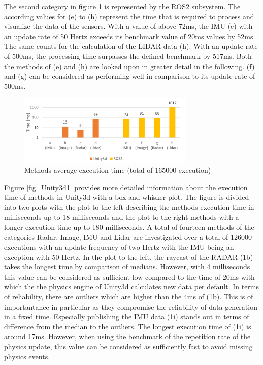 	The second category in figure \ref{fig_time} is represented by the \ac{ROS2} subsystem. The according values for (e) to (h) represent the time that is required to process and visualize the data of the sensors. With a value of above 72ms, the \ac{IMU} (e) with an update rate of 50 Hertz exceeds its benchmark value of 20ms values by 52ms. The same counts for the calculation of the \ac{LIDAR} data (h). With an update rate of 500ms, the processing time surpasses the defined benchmark by 517ms. Both the methods of (e) and (h) are looked upon in greater detail in the following. (f) and (g) can be considered as performing well in comparison to its update rate of 500ms. 
	\begin{figure}
		\begin{centering}
			\includegraphics[width=0.75\textwidth]{Bilder/Time.PNG}
			\caption{Methods average execution time (total of 165000 execution)}
			\label{fig_time}%
		\end{centering}
	\end{figure}
	
	Figure \ref{fig_Unity3d1} provides more detailed information about the execution time of methods in Unity3d with a box and whisker plot. The figure is divided into two plots with the plot to the left describing the methods execution time in milliseconds up to 18 milliseconds and the plot to the right methods with a longer execution time up to 180 milliseconds. A total of fourteen methods of the categories Radar, Image, \ac{IMU} and Lidar are investigated over a total of 126000 executions with an update frequency of two Hertz with the \ac{IMU} being an exception with 50 Hertz. In the plot to the left, the raycast of the \ac{RADAR} (1b) takes the longest time by comparison of medians. However, with 4 milliseconds this value can be considered as sufficient low compared to the time of 20ms with which the the physics engine of Unity3d calculates new data per default. In terms of reliability, there are outliers which are higher than the 4ms of (1b). This is of importantance in particular as they compromise the reliability of data generation in a fixed time. Especially publishing the \ac{IMU} data (1i) stands out in terms of difference from the median to the outliers. The longest execution time of (1i) is around 17ms. However, when using the benchmark of the repetition rate of the physics update, this value can be considered as sufficiently fast to avoid missing physics events.\\
	
